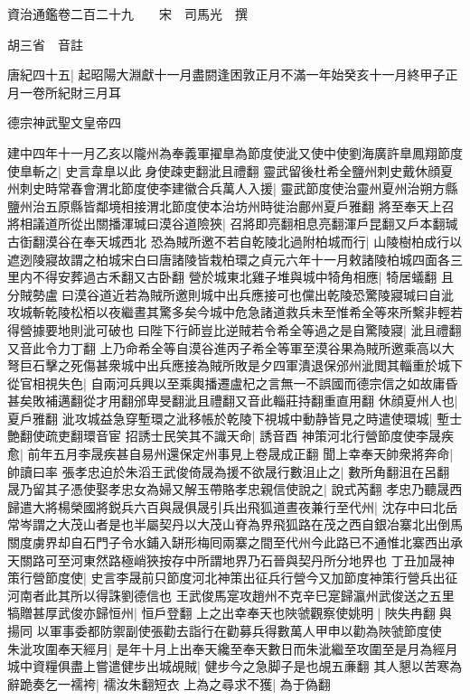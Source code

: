 資治通鑑卷二百二十九　　宋　司馬光　撰

胡三省　音註

唐紀四十五|{
	起昭陽大淵獻十一月盡閼逢困敦正月不滿一年始癸亥十一月終甲子正月一卷所紀財三月耳}


德宗神武聖文皇帝四

建中四年十一月乙亥以隴州為奉義軍擢臯為節度使泚又使中使劉海廣許臯鳳翔節度使臯斬之|{
	史言韋臯以此身使疎吏翻泚且禮翻}
靈武留後杜希全鹽州刺史戴休顔夏州刺史時常春會渭北節度使李建徽合兵萬人入援|{
	靈武節度使治靈州夏州治朔方縣鹽州治五原縣皆鄰境相接渭北節度使本治坊州時徙治鄜州夏戶雅翻}
將至奉天上召將相議道所從出關播渾瑊曰漠谷道險狹|{
	召將即亮翻相息亮翻渾戶昆翻又戶本翻瑊古衘翻漠谷在奉天城西北}
恐為賊所邀不若自乾陵北過附柏城而行|{
	山陵樹柏成行以遮迾陵寢故謂之柏城宋白曰唐諸陵皆栽柏環之貞元六年十一月敕諸陵柏城四面各三里内不得安葬過古禾翻又古卧翻}
營於城東北雞子堆與城中犄角相應|{
	犄居蟻翻}
且分賊勢盧曰漠谷道近若為賊所邀則城中出兵應接可也儻出乾陵恐驚陵寢瑊曰自泚攻城斬乾陵松栢以夜繼晝其驚多矣今城中危急諸道救兵未至惟希全等來所繫非輕若得營據要地則泚可破也曰陛下行師豈比逆賊若令希全等過之是自驚陵寢|{
	泚且禮翻又音此令力丁翻}
上乃命希全等自漠谷進丙子希全等軍至漠谷果為賊所邀乘高以大弩巨石擊之死傷甚衆城中出兵應接為賊所敗是夕四軍潰退保邠州泚閲其輜重於城下從官相視失色|{
	自兩河兵興以至乘輿播遷盧杞之言無一不誤國而德宗信之如故庸昏甚矣敗補邁翻從才用翻邠卑旻翻泚且禮翻又音此輜莊持翻重直用翻}
休顔夏州人也|{
	夏戶雅翻}
泚攻城益急穿塹環之泚移帳於乾陵下視城中動静皆見之時遣使環城|{
	塹士艶翻使疏吏翻環音宦}
招誘士民笑其不識天命|{
	誘音酉}
神策河北行營節度使李晟疾愈|{
	前年五月李晟疾甚自易州還保定州事見上卷晟成正翻}
聞上幸奉天帥衆將奔命|{
	帥讀曰率}
張孝忠迫於朱滔王武俊倚晟為援不欲晟行數沮止之|{
	數所角翻沮在呂翻}
晟乃留其子憑使娶孝忠女為婦又解玉帶賂孝忠親信使說之|{
	說式芮翻}
孝忠乃聽晟西歸遣大將楊榮國將鋭兵六百與晟俱晟引兵出飛狐道晝夜兼行至代州|{
	沈存中曰北岳常岑謂之大茂山者是也半屬契丹以大茂山脊為界飛狐路在茂之西自銀冶寨北出倒馬關度虜界却自石門子令水鋪入缾形梅囘兩寨之間至代州今此路已不通惟北寨西出承天關路可至河東然路極峭狹按存中所謂地界乃石晉與契丹所分地界也}
丁丑加晟神策行營節度使|{
	史言李晟前只節度河北神策出征兵行營今又加節度神策行營兵出征河南者此其所以得誅劉德信也}
王武俊馬寔攻趙州不克辛巳寔歸瀛州武俊送之五里犒贈甚厚武俊亦歸恒州|{
	恒戶登翻}
上之出幸奉天也陜虢觀察使姚明|{
	陜失冉翻與揚同}
以軍事委都防禦副使張勸去詣行在勸募兵得數萬人甲申以勸為陜虢節度使　朱泚攻圍奉天經月|{
	是年十月上出奉天纔至奉天數日而朱泚繼至攻圍至是月為經月}
城中資糧俱盡上嘗遣健步出城覘賊|{
	健步今之急脚子是也覘五亷翻}
其人懇以苦寒為辭跪奏乞一襦袴|{
	襦汝朱翻短衣}
上為之尋求不獲|{
	為于偽翻}
